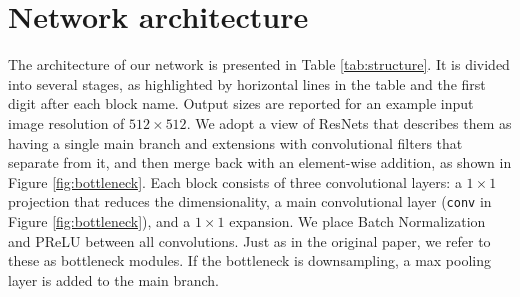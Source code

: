 \documentclass{article}
\begin{document}
\section{Network architecture} \label{architecture}

The architecture of our network is presented in Table \ref{tab:structure}.
It is divided into several stages, as highlighted by horizontal lines in the table and the first digit after each block name.
Output sizes are reported for an example input image resolution of $512 \times 512$.
We adopt a view of ResNets \cite{he2015resnet} that describes them as having a single main branch and extensions with convolutional filters that separate from it, and then merge back with an element-wise addition, as shown in Figure \ref{fig:bottleneck}.
Each block consists of three convolutional layers: a $1 \times 1$ projection that reduces the dimensionality, a main convolutional layer (\texttt{conv} in Figure \ref{fig:bottleneck}), and a $1 \times 1$ expansion.
We place Batch Normalization \cite{ioffe2015batchnorm} and PReLU \cite{he2015} between all convolutions.
Just as in the original paper, we refer to these as bottleneck modules.
If the bottleneck is downsampling, a max pooling layer is added to the main branch.
\end{document}
